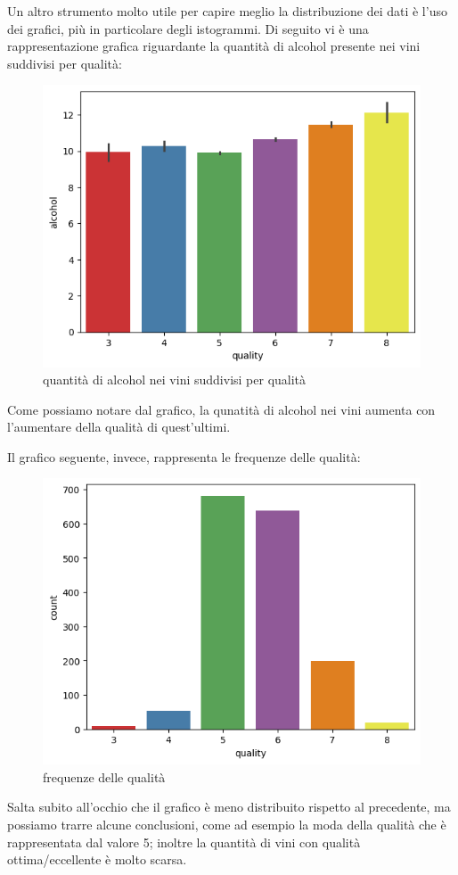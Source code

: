 \documentclass{article}
\begin{document}
\begin{titlepage}
        \newpage
        Un altro strumento molto utile per capire meglio la distribuzione dei dati è l'uso dei grafici, più in particolare degli istogrammi. Di seguito vi è una rappresentazione grafica riguardante la quantità di alcohol presente nei vini suddivisi per qualità:

        \begin{figure}[ht]
            \centering
            \includegraphics[width=0.5\linewidth]{barPlot-alcohol.png}
            \caption{ quantità di alcohol nei vini suddivisi per qualità}
            \label{fig:enter-label}
        \end{figure}

        Come possiamo notare dal grafico, la qunatità di alcohol nei vini aumenta con l'aumentare della qualità di quest'ultimi.
        
        Il grafico seguente, invece, rappresenta le frequenze delle qualità:
        
        \begin{figure}[ht]
            \centering
            \includegraphics[width=0.5\linewidth]{countPlot-quality.png}
            \caption{ frequenze delle qualità}
            \label{fig:enter-label}
        \end{figure}

        Salta subito all'occhio che il grafico è meno distribuito rispetto al precedente, ma possiamo trarre alcune conclusioni, come ad esempio la moda della qualità che è rappresentata dal valore 5; inoltre la quantità di vini con qualità ottima/eccellente è molto scarsa.


\end{titlepage}
\end{document}
